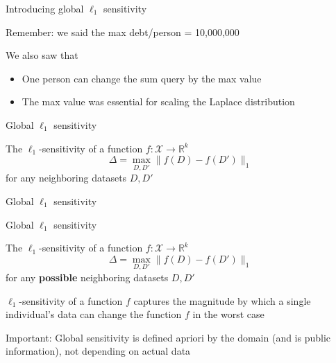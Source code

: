 \documentclass[12pt,aspectratio=169,handout]{beamer}
\begin{document}
\begin{frame}{Introducing global $\ell_1$ sensitivity}

Remember: we said the max debt/person = 10,000,000 \texteuro

We also saw that
\begin{itemize}
\item One person can change the sum query by the max value
\item The max value was essential for scaling the Laplace distribution
\end{itemize}

\begin{block}{Global $\ell_1$ sensitivity}

The $\ell_1$-sensitivity of a function $f : \mathcal{X} \rightarrow \mathbb{R}^k$
$$\Delta = \max_{D, D'} \| f(D) - f(D') \|_1$$
for any neighboring datasets $D, D'$
\end{block}


\end{frame}

\begin{frame}{Global $\ell_1$ sensitivity}

\begin{block}{Global $\ell_1$ sensitivity}

The $\ell_1$-sensitivity of a function $f : \mathcal{X} \rightarrow \mathbb{R}^k$
$$\Delta = \max_{D, D'} \| f(D) - f(D') \|_1$$
for any \textbf{possible} neighboring datasets $D, D'$
\end{block}

$\ell_1$-sensitivity of a function $f$ captures the magnitude by which a single individual’s data can change the function $f$ in the worst case

Important: Global sensitivity is defined apriori by the domain (and is public information), not depending on actual data



\end{frame}
\end{document}
